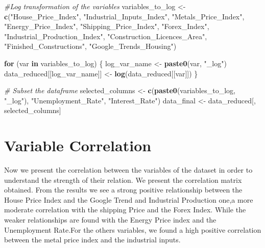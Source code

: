 \documentclass[
]{article}
\newenvironment{Shaded}{\begin{snugshade}}{\end{snugshade}}
\newcommand{\CommentTok}[1]{\textcolor[rgb]{0.56,0.35,0.01}{\textit{#1}}}
\newcommand{\ControlFlowTok}[1]{\textcolor[rgb]{0.13,0.29,0.53}{\textbf{#1}}}
\newcommand{\FunctionTok}[1]{\textcolor[rgb]{0.13,0.29,0.53}{\textbf{#1}}}
\newcommand{\NormalTok}[1]{#1}
\newcommand{\OtherTok}[1]{\textcolor[rgb]{0.56,0.35,0.01}{#1}}
\newcommand{\StringTok}[1]{\textcolor[rgb]{0.31,0.60,0.02}{#1}}
\begin{document}
\begin{Shaded}
\begin{Highlighting}[]
\CommentTok{\#Log transformation of the variables}
\NormalTok{variables\_to\_log }\OtherTok{\textless{}{-}} \FunctionTok{c}\NormalTok{(}\StringTok{"House\_Price\_Index"}\NormalTok{, }\StringTok{"Industrial\_Inputs\_Index"}\NormalTok{, }\StringTok{"Metals\_Price\_Index"}\NormalTok{,}
                      \StringTok{"Energy\_Price\_Index"}\NormalTok{, }\StringTok{"Shipping\_Price\_Index"}\NormalTok{, }\StringTok{"Forex\_Index"}\NormalTok{,}
                      \StringTok{"Industrial\_Production\_Index"}\NormalTok{, }\StringTok{"Construction\_Licences\_Area"}\NormalTok{,}
                      \StringTok{"Finished\_Constructions"}\NormalTok{, }\StringTok{"Google\_Trends\_Housing"}\NormalTok{)}


\ControlFlowTok{for}\NormalTok{ (var }\ControlFlowTok{in}\NormalTok{ variables\_to\_log) \{}
\NormalTok{  log\_var\_name }\OtherTok{\textless{}{-}} \FunctionTok{paste0}\NormalTok{(var, }\StringTok{"\_log"}\NormalTok{)}
\NormalTok{  data\_reduced[[log\_var\_name]] }\OtherTok{\textless{}{-}} \FunctionTok{log}\NormalTok{(data\_reduced[[var]])}
\NormalTok{\}}

\CommentTok{\# Subset the dataframe}
\NormalTok{selected\_columns }\OtherTok{\textless{}{-}} \FunctionTok{c}\NormalTok{(}\FunctionTok{paste0}\NormalTok{(variables\_to\_log, }\StringTok{"\_log"}\NormalTok{), }\StringTok{"Unemployment\_Rate"}\NormalTok{, }\StringTok{"Interest\_Rate"}\NormalTok{)}
\NormalTok{data\_final }\OtherTok{\textless{}{-}}\NormalTok{ data\_reduced[, selected\_columns]}
\end{Highlighting}
\end{Shaded}

\section{Variable Correlation}\label{variable-correlation}

Now we present the correlation between the variables of the dataset in
order to understand the strength of their relation. We present the
correlation matrix obtained. From the results we see a strong positive
relationship between the House Price Index and the Google Trend and
Industrial Production one,a more moderate correlation with the shipping
Price and the Forex Index. While the weaker relationships are found with
the Energy Price index and the Unemployment Rate.For the others
variables, we found a high positive correlation between the metal price
index and the industrial inputs.
\end{document}
